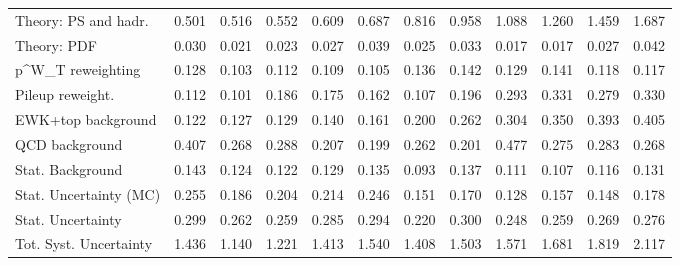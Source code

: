 \begin{tabular}{l|p{0.6cm}p{0.6cm}p{0.6cm}p{0.6cm}p{0.6cm}p{0.6cm}p{0.6cm}p{0.6cm}p{0.6cm}p{0.6cm}p{0.6cm}}
Theory: PS and hadr.                     & 0.501 & 0.516 & 0.552 & 0.609 & 0.687 & 0.816 & 0.958 & 1.088 & 1.260 & 1.459 & 1.687 \\
Theory: PDF                              & 0.030 & 0.021 & 0.023 & 0.027 & 0.039 & 0.025 & 0.033 & 0.017 & 0.017 & 0.027 & 0.042 \\
p^{W}_{T} reweighting                    & 0.128 & 0.103 & 0.112 & 0.109 & 0.105 & 0.136 & 0.142 & 0.129 & 0.141 & 0.118 & 0.117 \\
Pileup reweight.                         & 0.112 & 0.101 & 0.186 & 0.175 & 0.162 & 0.107 & 0.196 & 0.293 & 0.331 & 0.279 & 0.330 \\
EWK+top background                       & 0.122 & 0.127 & 0.129 & 0.140 & 0.161 & 0.200 & 0.262 & 0.304 & 0.350 & 0.393 & 0.405 \\
QCD background                           & 0.407 & 0.268 & 0.288 & 0.207 & 0.199 & 0.262 & 0.201 & 0.477 & 0.275 & 0.283 & 0.268 \\
Stat. Background                         & 0.143 & 0.124 & 0.122 & 0.129 & 0.135 & 0.093 & 0.137 & 0.111 & 0.107 & 0.116 & 0.131 \\
Stat. Uncertainty (MC)                   & 0.255 & 0.186 & 0.204 & 0.214 & 0.246 & 0.151 & 0.170 & 0.128 & 0.157 & 0.148 & 0.178 \\
\hline
Stat. Uncertainty                        & 0.299 & 0.262 & 0.259 & 0.285 & 0.294 & 0.220 & 0.300 & 0.248 & 0.259 & 0.269 & 0.276 \\
\hline
Tot. Syst. Uncertainty                   & 1.436 & 1.140 & 1.221 & 1.413 & 1.540 & 1.408 & 1.503 & 1.571 & 1.681 & 1.819 & 2.117 \\
\hline
\end{tabular}
